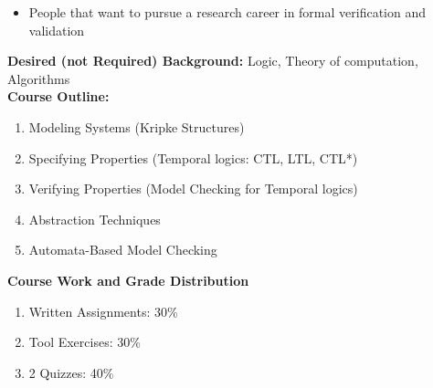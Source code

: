 \documentclass{article}
\begin{document}
{\begin{itemize}
\item People that want to pursue a research career in formal verification and validation
\end{itemize}
\noindent
\textbf{Desired (not Required) Background:} Logic, Theory of computation, Algorithms \\[0.25cm]
\noindent
\textbf{Course Outline:}
\begin{enumerate}
\item Modeling Systems (Kripke Structures)
\item Specifying Properties (Temporal logics: CTL, LTL, CTL*)
\item Verifying Properties (Model Checking for Temporal logics)
\item Abstraction Techniques
\item Automata-Based Model Checking
\end{enumerate}
\noindent
\textbf{Course Work and Grade Distribution}
\begin{enumerate}
\item  Written Assignments: 30\%

\item  Tool Exercises: 30\%

\item  2 Quizzes: 40\%

\end{enumerate}
}

%
%
\end{document}
